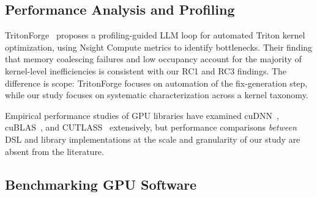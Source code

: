 %
%

\subsection{Performance Analysis and Profiling}
\label{sec:rel:profiling}

TritonForge~\cite{li2025tritonforge} proposes a profiling-guided LLM loop
for automated Triton kernel optimization,
using Nsight Compute metrics to identify bottlenecks.
Their finding that memory coalescing failures and low occupancy
account for the majority of kernel-level inefficiencies
is consistent with our RC1 and RC3 findings.
The difference is scope:
TritonForge focuses on automation of the fix-generation step,
while our study focuses on systematic characterization across a kernel taxonomy.

Empirical performance studies of GPU libraries have examined cuDNN~\cite{chetlur2014cudnn},
cuBLAS~\cite{cublas2024}, and CUTLASS~\cite{cutlass2023} extensively,
but performance comparisons \emph{between} DSL and library implementations
at the scale and granularity of our study are absent from the literature.

\subsection{Benchmarking GPU Software}
\label{sec:rel:bench}

